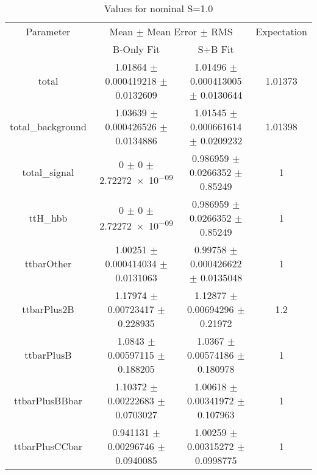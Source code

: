 \begin{table}
\centering
\caption{Values for nominal S=1.0}
\begin{tabular}{cccc}
\toprule
Parameter & \multicolumn{2}{c}{Mean $\pm$ Mean Error $\pm$ RMS} & Expectation\\
 & B-Only Fit & S+B Fit & \\
\midrule
total & \num{1.01864} $\pm$ \num{0.000419218} $\pm$ \num{0.0132609} & \num{1.01496} $\pm$ \num{0.000413005} $\pm$ \num{0.0130644} & \num{1.01373}\\
total\_background & \num{1.03639} $\pm$ \num{0.000426526} $\pm$ \num{0.0134886} & \num{1.01545} $\pm$ \num{0.000661614} $\pm$ \num{0.0209232} & \num{1.01398}\\
total\_signal & \num{0} $\pm$ \num{0} $\pm$ \num{2.72272e-09} & \num{0.986959} $\pm$ \num{0.0266352} $\pm$ \num{0.85249} & \num{1}\\
ttH\_hbb & \num{0} $\pm$ \num{0} $\pm$ \num{2.72272e-09} & \num{0.986959} $\pm$ \num{0.0266352} $\pm$ \num{0.85249} & \num{1}\\
ttbarOther & \num{1.00251} $\pm$ \num{0.000414034} $\pm$ \num{0.0131063} & \num{0.99758} $\pm$ \num{0.000426622} $\pm$ \num{0.0135048} & \num{1}\\
ttbarPlus2B & \num{1.17974} $\pm$ \num{0.00723417} $\pm$ \num{0.228935} & \num{1.12877} $\pm$ \num{0.00694296} $\pm$ \num{0.21972} & \num{1.2}\\
ttbarPlusB & \num{1.0843} $\pm$ \num{0.00597115} $\pm$ \num{0.188205} & \num{1.0367} $\pm$ \num{0.00574186} $\pm$ \num{0.180978} & \num{1}\\
ttbarPlusBBbar & \num{1.10372} $\pm$ \num{0.00222683} $\pm$ \num{0.0703027} & \num{1.00618} $\pm$ \num{0.00341972} $\pm$ \num{0.107963} & \num{1}\\
ttbarPlusCCbar & \num{0.941131} $\pm$ \num{0.00296746} $\pm$ \num{0.0940085} & \num{1.00259} $\pm$ \num{0.00315272} $\pm$ \num{0.0998775} & \num{1}\\
\bottomrule
\end{tabular}
\end{table}